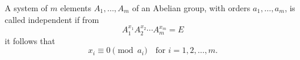 A system of $m$ elements $A_1, \ldots, A_m$ of an Abelian group, with orders $a_1, \ldots, a_m$, is called independent if from
$$A_1^{x_1} A_2^{x_2} \cdots A_m^{x_m} = E$$
it follows that
$$x_i \equiv 0 \pmod{a_i} \quad \text{for } i = 1, 2, \ldots, m.$$
